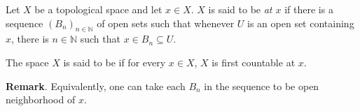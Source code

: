 \documentclass{article}
\begin{document}
Let $X$ be a topological space and let $x\in X$.  $X$ is said to be \emph{ at $x$} if there is a sequence $(B_n)_{n\in\mathbb{N}}$ of open sets such that whenever $U$ is an open set containing $x$, there is $n\in\mathbb{N}$ such that $x\in B_n\subseteq U$.

The space $X$ is said to be \emph{} if for every $x\in X$, $X$ is first countable at $x$.

\textbf{Remark}.  Equivalently, one can take each $B_n$ in the sequence to be open neighborhood of $x$.
\end{document}
